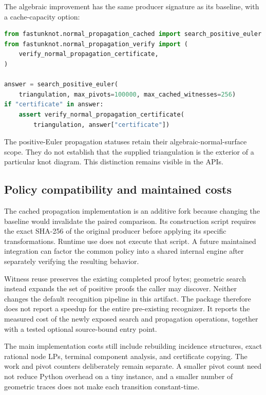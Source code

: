 The algebraic improvement has the same producer signature as its baseline,
with a cache-capacity option:

\begin{lstlisting}[language=Python]
from fastunknot.normal_propagation_cached import search_positive_euler
from fastunknot.normal_propagation_verify import (
    verify_normal_propagation_certificate,
)

answer = search_positive_euler(
    triangulation, max_pivots=100000, max_cached_witnesses=256)
if "certificate" in answer:
    assert verify_normal_propagation_certificate(
        triangulation, answer["certificate"])
\end{lstlisting}

The positive-Euler propagation statuses retain their algebraic-normal-surface
scope. They do not establish that the supplied triangulation is the exterior
of a particular knot diagram. This distinction remains visible in the APIs.

\subsection{Policy compatibility and maintained costs}

The cached propagation implementation is an additive fork because changing
the baseline would invalidate the paired comparison. Its construction script
requires the exact SHA-256 of the original producer before applying its
specific transformations. Runtime use does not execute that script. A future
maintained integration can factor the common policy into a shared internal
engine after separately verifying the resulting behavior.

Witness reuse preserves the existing completed proof bytes; geometric search
instead expands the set of positive proofs the caller may discover. Neither
changes the default recognition pipeline in this artifact. The package
therefore does not report a speedup for the entire pre-existing recognizer.
It reports the measured cost of the newly exposed search and propagation
operations, together with a tested optional source-bound entry point.

The main implementation costs still include rebuilding incidence structures,
exact rational node LPs, terminal component analysis, and certificate copying.
The work and pivot counters deliberately remain separate. A smaller pivot
count need not reduce Python overhead on a tiny instance, and a smaller
number of geometric traces does not make each transition constant-time.
